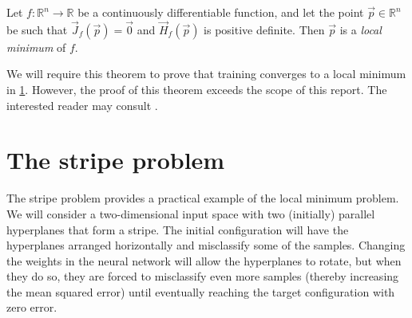 \begin{theorem}
    Let $f: \mathbb{R}^n \rightarrow \mathbb{R}$ be a continuously differentiable function, and let the point
    $\vec{p} \in \mathbb{R}^n$
    be such that
    $\vec{J}_f(\vec{p}) = \vec{0}$
    and
    $\vec{H}_f(\vec{p})$ is positive definite.
    Then $\vec{p}$ is a \textit{local minimum} of $f$.
\end{theorem}
We will require this theorem to prove that training converges to a local minimum in \ref{sec:stripe_problem}.
However, the proof of this theorem exceeds the scope of this report.
The interested reader may consult \textcite[190]{loomis1990}.


\section{The stripe problem}
\label{sec:stripe_problem}
The stripe problem provides a practical example of the local minimum problem. 
We will consider a two-dimensional input space with two (initially) parallel hyperplanes that form a stripe.
The initial configuration will have the hyperplanes arranged horizontally and misclassify some of the samples. 
Changing the weights in the neural network will allow the hyperplanes to rotate, but when they do so, they are forced to misclassify even more samples (thereby increasing the mean squared error) until eventually reaching the target configuration with zero error.

